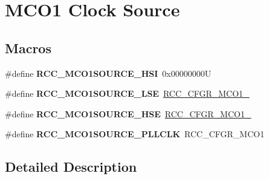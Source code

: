 \hypertarget{group___r_c_c___m_c_o1___clock___source}{}\section{M\+C\+O1 Clock Source}
\label{group___r_c_c___m_c_o1___clock___source}
\subsection*{Macros}
\begin{DoxyCompactItemize}
\item 
\mbox{\label{group___r_c_c___m_c_o1___clock___source_gad99c388c455852143220397db3730635}} 
\#define {\bfseries R\+C\+C\+\_\+\+M\+C\+O1\+S\+O\+U\+R\+C\+E\+\_\+\+H\+SI}~0x00000000U
\item 
\mbox{\label{group___r_c_c___m_c_o1___clock___source_gaa01b6cb196df3a4ad690f8bcaa4d0621}} 
\#define {\bfseries R\+C\+C\+\_\+\+M\+C\+O1\+S\+O\+U\+R\+C\+E\+\_\+\+L\+SE}~\hyperlink{group___peripheral___registers___bits___definition_gafe73b3ad484eeecfa1556021677ecf4a}{R\+C\+C\+\_\+\+C\+F\+G\+R\+\_\+\+M\+C\+O1\+\_}
\item 
\mbox{\label{group___r_c_c___m_c_o1___clock___source_ga5582d2ab152eb440a6cc3ae4833b043f}} 
\#define {\bfseries R\+C\+C\+\_\+\+M\+C\+O1\+S\+O\+U\+R\+C\+E\+\_\+\+H\+SE}~\hyperlink{group___peripheral___registers___bits___definition_ga1c7e8d1da534f052ce835f06227a9b7a}{R\+C\+C\+\_\+\+C\+F\+G\+R\+\_\+\+M\+C\+O1\+\_}
\item 
\mbox{\label{group___r_c_c___m_c_o1___clock___source_ga79d888f2238eaa4e4b8d02b3900ea18b}} 
\#define {\bfseries R\+C\+C\+\_\+\+M\+C\+O1\+S\+O\+U\+R\+C\+E\+\_\+\+P\+L\+L\+C\+LK}~R\+C\+C\+\_\+\+C\+F\+G\+R\+\_\+\+M\+C\+O1
\end{DoxyCompactItemize}


\subsection{Detailed Description}
